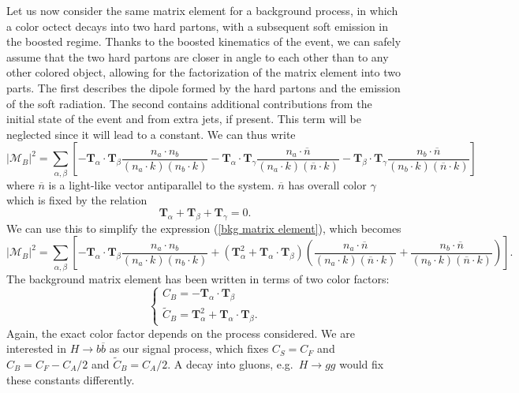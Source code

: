 \documentclass[10pt,a4paper]{book}
\begin{document}
Let us now consider the same matrix element for a background process, in which a color octect decays into two hard partons, with a subsequent soft emission in the boosted regime. Thanks to the boosted kinematics of the event, we can safely assume that the two hard partons are closer in angle to each other than to any other colored object, allowing for the factorization of the matrix element into two parts. The first describes the dipole formed by the hard partons and the emission of the soft radiation. The second contains additional contributions from the initial state of the event and from extra jets, if present. This term will be neglected since it will lead to a constant. We can thus write
\begin{equation}
\vert \mathcal{M}_B \vert^2 = \sum_{\alpha, \beta} \left[ -\mathbf{T}_\alpha \cdot \mathbf{T}_\beta 	\frac{n_a \cdot n_b}{(n_a \cdot k)(n_b \cdot k)} - \mathbf{T}_\alpha \cdot \mathbf{T}_\gamma \frac{n_a \cdot \overline{n}}{(n_a \cdot k)(\overline{n} \cdot k)} - \mathbf{T}_\beta \cdot \mathbf{T}_\gamma 	\frac{n_b \cdot \overline{n}}{(n_b \cdot k)(\overline{n} \cdot k)} \right]
\label{bkg matrix element}
\end{equation}
where $\overline{n}$ is a light-like vector antiparallel to the system. $\overline{n}$ has overall color $\gamma$ which is fixed by the relation
\begin{equation}
\mathbf{T}_\alpha + \mathbf{T}_\beta + \mathbf{T}_\gamma = 0.
\end{equation}
We can use this to simplify the expression (\ref{bkg matrix element}), which becomes
\begin{equation}
\vert \mathcal{M}_B \vert^2 = \sum_{\alpha, \beta} \left[ -\mathbf{T}_\alpha \cdot \mathbf{T}_\beta 	\frac{n_a \cdot n_b}{(n_a \cdot k)(n_b \cdot k)} + (\mathbf{T}_\alpha^2 + \mathbf{T}_\alpha \cdot \mathbf{T}_\beta)\left(\frac{n_a \cdot \overline{n}}{(n_a \cdot k)(\overline{n} \cdot k)} + \frac{n_b \cdot \overline{n}}{(n_b \cdot k)(\overline{n} \cdot k)}\right) \right].
\end{equation}
The background matrix element has been written in terms of two color factors:
\begin{equation}
\begin{cases}
C_B = -\mathbf{T}_\alpha \cdot \mathbf{T}_\beta \\
\tilde{C}_B = \mathbf{T}_\alpha^2 + \mathbf{T}_\alpha \cdot \mathbf{T}_\beta.
\end{cases}
\end{equation}
Again, the exact color factor depends on the process considered. We are interested in $H\rightarrow b\overline{b}$ as our signal process, which fixes $C_S = C_F$ and $C_B = C_F - C_A/2$ and $\widetilde{C}_B = C_A/2$. A decay into gluons, e.g.\ $H\rightarrow gg$ would fix these constants differently.
\end{document}
